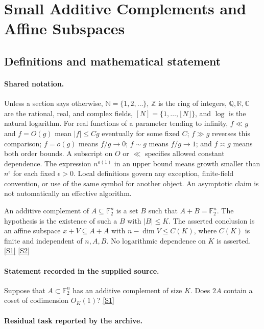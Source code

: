 \documentclass[11pt,a4paper]{article}
\newcommand{\N}{\mathbb{N}}
\newcommand{\Z}{\mathbb{Z}}
\newcommand{\Q}{\mathbb{Q}}
\newcommand{\R}{\mathbb{R}}
\newcommand{\C}{\mathbb{C}}
\newcommand{\F}{\mathbb{F}}
\newcommand{\sref}[2]{\hyperlink{source:#1:#2}{[S#2]}}
\begin{document}
\section{Small Additive Complements and Affine Subspaces}\label{statement}


\subsection{Definitions and mathematical statement}

\paragraph{Shared notation.}Unless a section says otherwise, $\N=\{1,2,\ldots\}$,
$\Z$ is the ring of integers, $\Q,\R,\C$ are the rational, real, and complex
fields, $[N]=\{1,\ldots,\lfloor N\rfloor\}$, and $\log$ is the natural
logarithm. For real functions of a parameter tending to infinity,
$f\ll g$ and $f=O(g)$ mean $|f|\leq Cg$ eventually for some fixed $C$;
$f\gg g$ reverses this comparison; $f=o(g)$ means $f/g\to0$;
$f\sim g$ means $f/g\to1$; and $f\asymp g$ means both order bounds.
A subscript on $O$ or $\ll$ specifies allowed constant dependence.
The expression $n^{o(1)}$ in an upper bound means growth smaller than
$n^\epsilon$ for each fixed $\epsilon>0$. Local definitions govern any
exception, finite-field convention, or use of the same symbol for another
object. An asymptotic claim is not automatically an effective algorithm.



An additive complement of $A\subseteq\F_2^n$ is a set $B$ such that $A+B=\F_2^n$. The hypothesis is the existence of such a $B$ with $|B|\leq K$. The asserted conclusion is an affine subspace $x+V\subseteq A+A$ with $n-\dim V\leq C(K)$, where $C(K)$ is finite and independent of $n,A,B$. No logarithmic dependence on $K$ is asserted. \sref{statement}{1} \sref{statement}{2}

\paragraph{Statement recorded in the supplied source.}
Suppose that $A \subset \mathbb{F}_2^n$ has an additive complement of size $K$. Does $2A$ contain a coset of codimension $O_K(1)$? \sref{statement}{1}

\paragraph{Residual task reported by the archive.}
\end{document}

